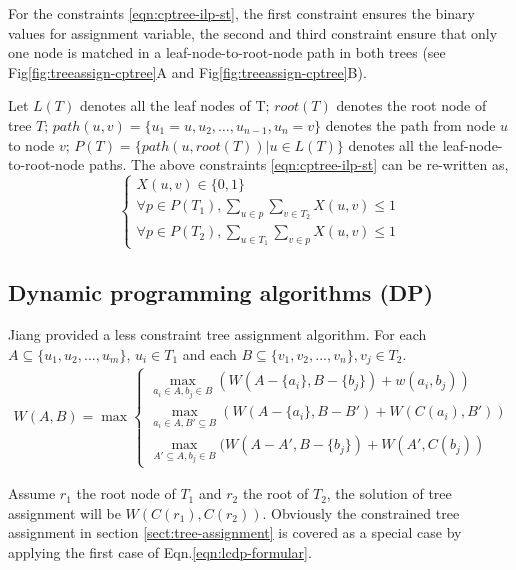 For the constraints \ref{eqn:cptree-ilp-st}, the first constraint ensures the binary values for assignment variable, the second and third constraint ensure that only one node is matched in a leaf-node-to-root-node path in both trees (see Fig\ref{fig:treeassign-cptree}A and Fig\ref{fig:treeassign-cptree}B). 

Let $L(T)$ denotes all the leaf nodes of T; $root(T)$ denotes the root node of tree $T$; $path(u,v) = \{u_1 = u,u_2, \ldots, u_{n-1}, u_n = v\}$ denotes the path from node $u$ to node $v$; $P(T) = \{path(u, root(T))|u \in L(T)\}$ denotes all the leaf-node-to-root-node paths. The above constraints \ref{eqn:cptree-ilp-st} can be re-written as,
\begin{equation}
\left\{
\begin{array}{l}
X(u,v) \in \{0,1\} \\
\forall p \in P(T_1), \sum\limits_{u\in p}\sum\limits_{v \in T_2} X(u,v) \le 1 \\
\forall p \in P(T_2), \sum\limits_{u\in T_1}\sum\limits_{v \in p} X(u,v) \le 1 
\end{array}
\right.
\end{equation}

\subsection{Dynamic programming algorithms (DP)}
Jiang \cite{Jiang:95} provided a less constraint tree assignment algorithm.
For each $A \subseteq \{u_1,u_2,...,u_m\}$, $u_i \in T_1$ and each $B \subseteq \{v_1,v_2,...,v_n\}, v_j \in T_2$.
\begin{eqnarray} \label{eqn:lcdp-formular}
W(A,B) = \max \begin{cases}
\max\limits_{a_i \in A, b_j \in B}(W(A-\{a_i\}, B-\{b_j\}) + w(a_i,b_j))\\
\max\limits_{a_i \in A, B' \subseteq B}(W(A-\{a_i\}, B-B') + W(C(a_i), B')) \\
\max\limits_{A' \subseteq A, b_j \in B}(W(A-A', B-\{b_j\}) + W(A', C(b_j))
\end{cases} 
\end{eqnarray}

Assume $r_1$ the root node of $T_1$ and $r_2$ the root of $T_2$, the solution of tree assignment will be $W(C(r_1), C(r_2))$.
Obviously the constrained tree assignment in section \ref{sect:tree-assignment} is covered as a special case by applying the first case of Eqn.\eqref{eqn:lcdp-formular}. 

